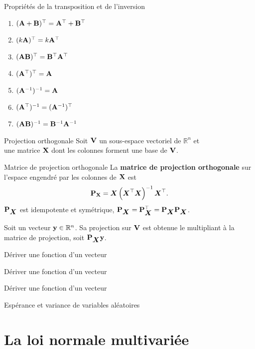 \documentclass{BeamerAAV}
\begin{document}
\begin{frame}{Propriétés de la transposition et de l'inversion}
\begin{enumerate}[label=(\roman*)]
\item $(\bold A+\bold B)^\top=\bold A^\top+\bold B^\top$
\item $(k\bold A)^\top=k\bold A^\top$
\item $(\bold A\bold B)^\top=\bold B^\top \bold A^\top$
\item $(\bold A^\top)^\top=\bold A$
\item $(\bold A^{-1})^{-1}=\bold A$
\item $(\bold A^\top)^{-1}=\bold (\bold A^{-1})^\top$
\item $(\bold A\bold B)^{-1}=\bold B^{-1} \bold A^{-1}$
\end{enumerate}
\end{frame}

\begin{frame}{Projection orthogonale}
Soit $\bold V$ un sous-espace vectoriel de $\mathbb{R}^n$ et \\
une matrice $\bold X$ dont les colonnes forment une base de $\bold V$. 
\begin{bte}{Matrice de projection orthogonale}
La \textbf{matrice de projection orthogonale} sur l'espace engendré par les colonnes de $\bold X$ est 
$$ \bold P_{\bold X} = \mbox{\boldmath$X$\unboldmath} \left( \mbox{\boldmath$X$\unboldmath}^\top \mbox{\boldmath$X$\unboldmath}\right)^{-1} \mbox{\boldmath$X$\unboldmath}^\top. $$
$\bold P_{\mbox{\boldmath$X$\unboldmath}}$  est idempotente et symétrique, $\bold P_{\mbox{\boldmath$X$\unboldmath}} = \bold P_{\mbox{\boldmath$X$\unboldmath}}^\top = \bold P_{\mbox{\boldmath$X$\unboldmath}} \bold P_{\mbox{\boldmath$X$\unboldmath}}$.
\end{bte}
Soit un vecteur $\bold y \in \mathbb{R}^n$. Sa projection sur $\bold V$ est obtenue le multipliant à la matrice de projection, soit $\bold P_{\mbox{\boldmath$X$\unboldmath}} \bold y$.
\end{frame}


\begin{frame}{Dériver une fonction d'un vecteur}
\end{frame}
\begin{frame}{Dériver une fonction d'un vecteur}
\end{frame}
\begin{frame}{Dériver une fonction d'un vecteur}
\end{frame}

\begin{frame}{Espérance et variance de variables aléatoires}
\end{frame}

\section{La loi normale multivariée}
\end{document}
